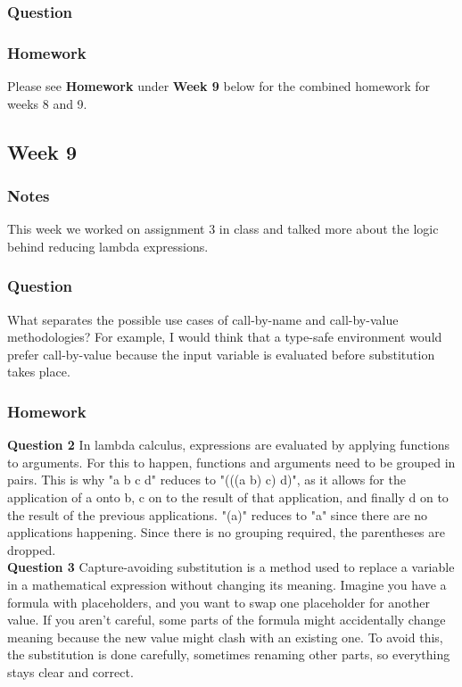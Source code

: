\documentclass{article}
\theoremstyle{theorem}
\theoremstyle{definition}
\theoremstyle{remark}
\begin{document}
\subsubsection*{Question} 

\subsubsection*{Homework}
Please see \textbf{Homework} under \textbf{Week 9} below for the combined homework for weeks 8 and 9.

\subsection{Week 9} 

\subsubsection*{Notes} This week we worked on assignment 3 in class and talked more about the logic behind reducing lambda expressions.

\subsubsection*{Question} What separates the possible use cases of call-by-name and call-by-value methodologies? For example, I would think that a type-safe environment would prefer call-by-value because the input variable is evaluated before substitution takes place. 

\subsubsection*{Homework}

\textbf{Question 2}
In lambda calculus, expressions are evaluated by applying functions to arguments. For this to happen, functions and arguments need to be grouped in pairs. This is why "a b c d" reduces to "(((a b) c) d)", as it allows for the application of a onto b, c on to the result of that application, and finally d on to the result of the previous applications. "(a)" reduces to "a" since there are no applications happening. Since there is no grouping required, the parentheses are dropped.\\

\textbf{Question 3}
Capture-avoiding substitution is a method used to replace a variable in a mathematical expression without changing its meaning. Imagine you have a formula with placeholders, and you want to swap one placeholder for another value. If you aren’t careful, some parts of the formula might accidentally change meaning because the new value might clash with an existing one. To avoid this, the substitution is done carefully, sometimes renaming other parts, so everything stays clear and correct.\\
\end{document}
